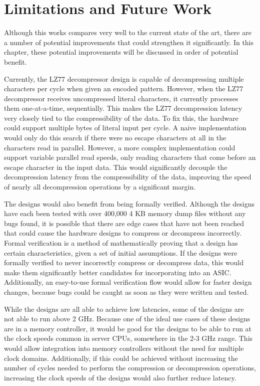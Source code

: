 \documentclass[doublespace,nopageskip]{VTthesis}
\begin{document}
\chapter{Limitations and Future Work} \label{ch:discussion}
Although this works compares very well to the current state of the art, there are a number of potential improvements that could strengthen it significantly. In this chapter, these potential improvements will be discussed in order of potential benefit.

Currently, the LZ77 decompressor design is capable of decompressing multiple characters per cycle when given an encoded pattern. However, when the LZ77 decompressor receives uncompressed literal characters, it currently processes them one-at-a-time, sequentially. This makes the LZ77 decompression latency very closely tied to the compressibility of the data. To fix this, the hardware could support multiple bytes of literal input per cycle. A naive implementation would only do this search if there were no escape characters at all in the characters read in parallel. However, a more complex implementation could support variable parallel read speeds, only reading characters that come before an escape character in the input data. This would significantly decouple the decompression latency from the compressibility of the data, improving the speed of nearly all decompression operations by a significant margin.

The designs would also benefit from being formally verified. Although the designs have each been tested with over 400,000 4 KB memory dump files without any bugs found, it is possible that there are edge cases that have not been reached that could cause the hardware designs to compress or decompress incorrectly. Formal verification is a method of mathematically proving that a design has certain characteristics, given a set of initial assumptions. If the designs were formally verified to never incorrectly compress or decompress data, this would make them significantly better candidates for incorporating into an ASIC. Additionally, an easy-to-use formal verification flow would allow for faster design changes, because bugs could be caught as soon as they were written and tested.

While the designs are all able to achieve low latencies, some of the designs are not able to run above 2 GHz. Because one of the ideal use cases of these designs are in a memory controller, it would be good for the designs to be able to run at the clock speeds common in server CPUs, somewhere in the 2-3 GHz range. This would allow integration into memory controllers without the need for multiple clock domains. Additionally, if this could be achieved without increasing the number of cycles needed to perform the compression or decompression operations, increasing the clock speeds of the designs would also further reduce latency.
\end{document}
